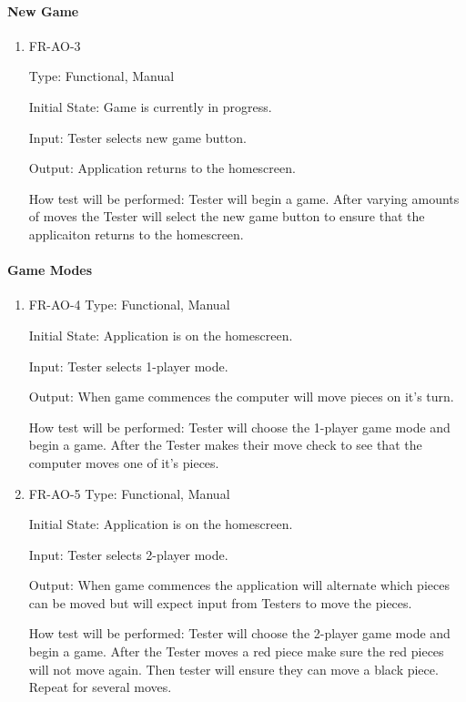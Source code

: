 \documentclass[12pt, titlepage]{article}
\begin{document}
\paragraph{New Game}
\begin{enumerate}
    \item{FR-AO-3}
    
    Type: Functional, Manual
    
    Initial State: Game is currently in progress.
    					
    Input: Tester selects new game button.
    					
    Output: Application returns to the homescreen.
    					
    How test will be performed: Tester will begin a game. After varying amounts of moves the Tester will select the new game button to ensure that the applicaiton returns to the homescreen.
\end{enumerate}

\paragraph{Game Modes}
\begin{enumerate}
    \item{FR-AO-4}
    Type: Functional, Manual
    
    Initial State: Application is on the homescreen.
    					
    Input: Tester selects 1-player mode.
    					
    Output: When game commences the computer will move pieces on it's turn.
    					
    How test will be performed: Tester will choose the 1-player game mode and begin a game. After the Tester makes their move check to see that the computer moves one of it's pieces.
    \item{FR-AO-5}
    Type: Functional, Manual
    
    Initial State: Application is on the homescreen.
    					
    Input: Tester selects 2-player mode.
    					
    Output: When game commences the application will alternate which pieces can be moved but will expect input from Testers to move the pieces.
    					
    How test will be performed: Tester will choose the 2-player game mode and begin a game. After the Tester moves a red piece make sure the red pieces will not move again. Then tester will ensure they can move a black piece. Repeat for several moves.
\end{enumerate}
\end{document}
